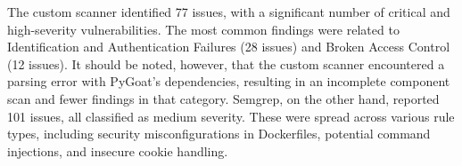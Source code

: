 \begin{table}[h!]
\centering
\caption{Vulnerabilities Identified in PyGoat}
\label{tab:pygoat_vulns}

\end{table}

The custom scanner identified 77 issues, with a significant number of critical and high-severity vulnerabilities. The most common findings were related to Identification and Authentication Failures (28 issues) and Broken Access Control (12 issues). It should be noted, however, that the custom scanner encountered a parsing error with PyGoat's dependencies, resulting in an incomplete component scan and fewer findings in that category. Semgrep, on the other hand, reported 101 issues, all classified as medium severity. These were spread across various rule types, including security misconfigurations in Dockerfiles, potential command injections, and insecure cookie handling.

